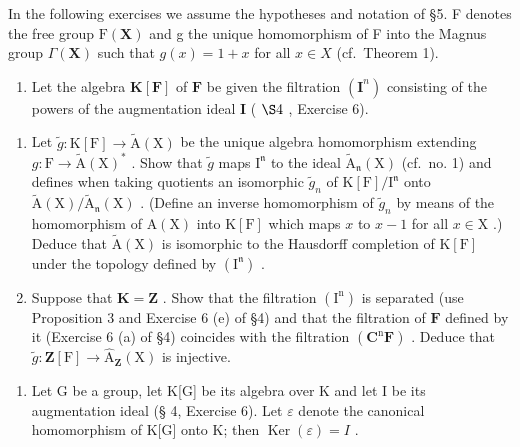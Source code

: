 
In the following exercises we assume the hypotheses and notation of §5. F denotes the free group \(\mathrm{F}(\mathbf{X})\) and g the unique homomorphism of F into the Magnus group \(\Gamma(\mathbf{X})\) such that \(g(x)=1+x\) for all \(x\in X\) (cf.~Theorem 1).

\begin{enumerate}
\def\labelenumi{\arabic{enumi}.}
\tightlist
\item
  Let the algebra \(\mathbf{K}[\mathbf{F}]\) of \(\mathbf{F}\) be given the filtration \((\mathbf{I}^n)\) consisting of the powers of the augmentation ideal \(\mathbf{I}\) ( \(\S 4\) , Exercise 6).
\end{enumerate}

\begin{enumerate}
\def\labelenumi{(\alph{enumi})}
\item
  Let \(\tilde{g}\colon \mathrm{K}[\mathrm{F}] \to \tilde{\mathrm{A}}(\mathrm{X})\) be the unique algebra homomorphism extending \(g\colon \mathrm{F} \to \tilde{\mathrm{A}}(\mathrm{X})^*\) . Show that \(\tilde{g}\) maps \(\mathrm{I}^{\mathfrak{n}}\) to the ideal \(\tilde{\mathrm{A}}_{\mathfrak{n}}(\mathrm{X})\) (cf.~no. 1) and defines when taking quotients an isomorphic \(\tilde{g}_{n}\) of \(\mathrm{K}[\mathrm{F}]/\mathrm{I}^{\mathfrak{n}}\) onto \(\tilde{\mathrm{A}}(\mathrm{X})/\tilde{\mathrm{A}}_{\mathfrak{n}}(\mathrm{X})\) . (Define an inverse homomorphism of \(\tilde{g}_{n}\) by means of the homomorphism of \(\mathrm{A}(\mathrm{X})\) into \(\mathrm{K}[\mathrm{F}]\) which maps \(x\) to \(x - 1\) for all \(x \in \mathrm{X}\) .) Deduce that \(\tilde{\mathrm{A}}(\mathrm{X})\) is isomorphic to the Hausdorff completion of \(\mathrm{K}[\mathrm{F}]\) under the topology defined by \((\mathrm{I}^{\mathfrak{n}})\) .
\item
  Suppose that \(\mathbf{K} = \mathbf{Z}\) . Show that the filtration \((\mathrm{I}^{\mathrm{n}})\) is separated (use Proposition 3 and Exercise 6 (e) of §4) and that the filtration of \(\mathbf{F}\) defined by it (Exercise 6 (a) of §4) coincides with the filtration \((\mathbf{C}^{\mathrm{n}}\mathbf{F})\) . Deduce that \(\tilde{g}\colon \mathbf{Z}[\mathrm{F}] \to \hat{\mathrm{A}}_{\mathbf{Z}}(\mathrm{X})\) is injective.
\end{enumerate}

\begin{enumerate}
\def\labelenumi{\arabic{enumi}.}
\setcounter{enumi}{1}
\tightlist
\item
  Let G be a group, let K{[}G{]} be its algebra over K and let I be its augmentation ideal (§ 4, Exercise 6). Let \(\varepsilon\) denote the canonical homomorphism of K{[}G{]} onto K; then \(\operatorname{Ker}(\varepsilon) = I\) .
\end{enumerate}

